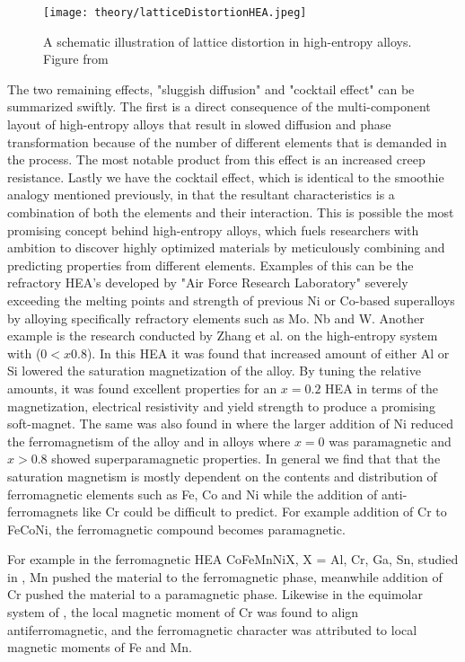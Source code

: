 \begin{figure} 
\centering
\texttt{[image: theory/latticeDistortionHEA.jpeg]}
\caption{A schematic illustration of lattice distortion in high-entropy alloys. Figure from \cite{owen_jones_2018}}
\end{figure}
 
The two remaining effects, "sluggish diffusion" and "cocktail effect" can be summarized swiftly. The first is a direct consequence of the multi-component layout of high-entropy alloys that result in slowed diffusion and phase transformation because of the number of different elements that is demanded in the process. The most notable product from this effect is an increased creep resistance. Lastly we have the cocktail effect, which is identical to the smoothie analogy mentioned previously, in that the resultant characteristics is a combination of both the elements and their interaction. This is possible the most promising concept behind high-entropy alloys, which fuels researchers with ambition to discover highly optimized materials by meticulously combining and predicting properties from different elements. Examples of this can be the refractory HEA's developed by "Air Force Research Laboratory" severely exceeding the melting points and strength of previous Ni or Co-based superalloys by alloying specifically refractory elements such as Mo. Nb and W. Another example is the research conducted by Zhang et al. on the high-entropy system  with ($0 < x 0.8$). In this HEA it was found that increased amount of either Al or Si lowered the saturation magnetization of the alloy. By tuning the relative amounts, it was found excellent properties for an $x=0.2$ HEA in terms of the magnetization, electrical resistivity and yield strength to produce a promising soft-magnet. The same was also found in  where the larger addition of Ni reduced the ferromagnetism of the alloy and in  alloys where $x = 0$ was paramagnetic and $x > 0.8$ showed superparamagnetic properties. In general we find that that the saturation magnetism is mostly dependent on the contents and distribution of ferromagnetic elements such as Fe, Co and Ni while the addition of anti-ferromagnets like Cr could be difficult to predict. For example addition of Cr to FeCoNi, the ferromagnetic compound becomes paramagnetic. 

For example in the ferromagnetic HEA CoFeMnNiX, X = Al, Cr, Ga, Sn, studied in \cite{ZUO201710}, Mn pushed the material to the ferromagnetic phase, meanwhile addition of Cr pushed the material to a paramagnetic phase. Likewise in the equimolar system of  \cite{PhysRevB.96.014437}, the local magnetic moment of Cr was found to align antiferromagnetic, and the ferromagnetic character was attributed to local magnetic moments of Fe and Mn. 